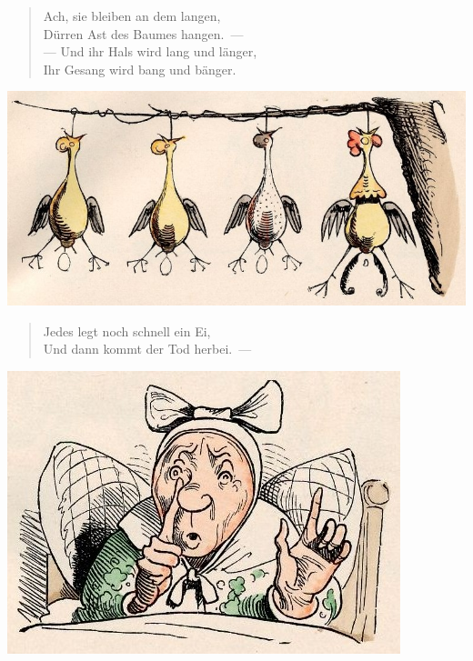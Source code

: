 \documentclass[a4paper,12pt]{article}
\begin{document}
\begin{verse}
Ach, sie bleiben an dem langen,\\{}
Dürren Ast des Baumes hangen.~—\\{}
— Und ihr Hals wird lang und länger,\\{}
Ihr Gesang wird bang und bänger.
\end{verse}



\begin{center}\includegraphics[scale=.7, alt={noch schnell ein Ei}]{images/1-10.jpg}\end{center}



\begin{verse}
Jedes legt noch schnell ein Ei,\\{}
Und dann kommt der Tod herbei.~—
\end{verse}



\begin{center}\includegraphics[scale=.7, alt={Witwe Bolte in der Kammer}]{images/1-11.jpg}\end{center}
\end{document}
